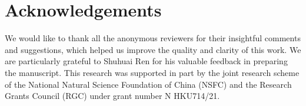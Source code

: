 \section*{Acknowledgements}
We would like to thank all the anonymous reviewers for their insightful comments and suggestions, which helped us improve the quality and clarity of this work. 
We are particularly grateful to Shuhuai Ren for his valuable feedback in preparing the manuscript.
This research
was supported in part by the joint research scheme of the
National Natural Science Foundation of China (NSFC) and
the Research Grants Council (RGC) under grant number
N HKU714/21.


